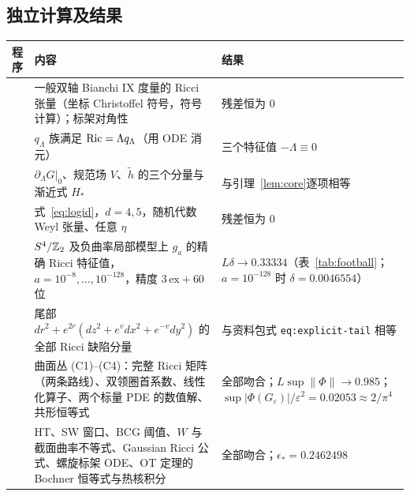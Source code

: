 \subsection{独立计算及结果}
\begin{longtable}{L{0.22\textwidth}L{0.48\textwidth}L{0.22\textwidth}}
\toprule 程序 & 内容 & 结果\\\midrule\endhead
{} & 一般双轴 Bianchi IX 度量的 Ricci 张量（坐标 Christoffel 符号，符号计算）；标架对角性 & 残差恒为 $0$\\
 & $q_\Lambda$ 族满足 $\operatorname{Ric}=\Lambda q_\Lambda$（用 ODE 消元） & 三个特征值 $-\Lambda\equiv0$\\
 & $\partial_\Lambda G|_0$、规范场 $V$、$\tilde h$ 的三个分量与渐近式 $H_*$ & 与引理~\ref{lem:core}逐项相等\\
 & 式~\eqref{eq:logid}，$d=4,5$，随机代数 Weyl 张量、任意 $\eta$ & 残差恒为 $0$\\
 & $S^4/\mathbb Z_2$ 及负曲率局部模型上 $g_a$ 的精确 Ricci 特征值，$a=10^{-8},\dots,10^{-128}$，精度 $3\,\mathrm{ex}+60$ 位 & $L\delta\to0.33334$（表~\ref{tab:football}；$a=10^{-128}$ 时 $\delta=0.0046554$）\\
 & 尾部 $dr^2+e^{2r}(dz^2+e^{v}dx^2+e^{-v}dy^2)$ 的全部 Ricci 缺陷分量 & 与资料包式 \texttt{eq:explicit-tail} 相等\\
 & 曲面丛 (C1)--(C4)：完整 Ricci 矩阵（两条路线）、双领圈首系数、线性化算子、两个标量 PDE 的数值解、共形恒等式 & 全部吻合；$L\sup\|\Phi\|\to0.985$；$\sup|\Phi(G_\varepsilon)|/\varepsilon^2=0.02053\approx2/\pi^4$\\
 & HT、SW 窗口、BCG 阈值、$W$ 与截面曲率不等式、Gaussian Ricci 公式、螺旋标架 ODE、OT 定理的 Bochner 恒等式与热核积分 & 全部吻合；$\epsilon_*=0.2462498$\\
\bottomrule
\end{longtable}

